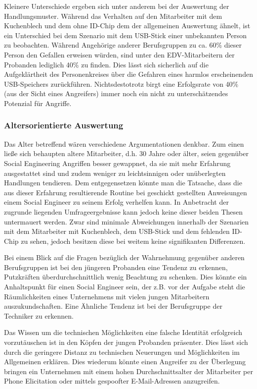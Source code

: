 Kleinere Unterschiede ergeben sich unter anderem bei der Auswertung der Handlungsmuster.
Während das Verhalten auf den Mitarbeiter mit dem Kuchenblech und dem ohne ID-Chip dem der allgemeinen Auswertung ähnelt, ist ein Unterschied bei dem Szenario mit dem USB-Stick einer unbekannten Person zu beobachten.
Während Angehörige anderer Berufsgruppen zu ca. 60\% dieser Person den Gefallen erweisen würden, sind unter den EDV-Mitarbeitern der Probanden lediglich 40\% zu finden.
Dies lässt sich sicherlich auf die Aufgeklärtheit des Personenkreises über die Gefahren eines harmlos erscheinenden USB-Speichers zurückführen.
Nichtsdestotrotz birgt eine Erfolgsrate von 40\% (aus der Sicht eines Angreifers) immer noch ein nicht zu unterschätzendes Potenzial für Angriffe.

\subsubsection{Altersorientierte Auswertung}\label{ref:altersorientierte-auswertung}

Das Alter betreffend wären verschiedene Argumentationen denkbar.
Zum einen ließe sich behaupten altere Mitarbeiter, d.h. 30 Jahre oder älter, seien gegenüber Social Engineering Angriffen besser gewappnet, da sie mit mehr Erfahrung ausgestattet sind und zudem weniger zu leichtsinnigen oder unüberlegten Handlungen tendieren.
Dem entgegensetzen könnte man die Tatsache, dass die aus dieser Erfahrung resultierende Routine bei geschickt gestellten Anweisungen einem Social Engineer zu seinem Erfolg verhelfen kann.
In Anbetracht der zugrunde liegenden Umfrageergebnisse kann jedoch keine dieser beiden Thesen untermauert werden.
Zwar sind minimale Abweichungen innerhalb der Szenarien mit dem Mitarbeiter mit Kuchenblech, dem USB-Stick und dem fehlenden ID-Chip zu sehen, jedoch besitzen diese bei weitem keine signifikanten Differenzen.

Bei einem Blick auf die Fragen bezüglich der Wahrnehmung gegenüber anderen Berufsgruppen ist bei den jüngeren Probanden eine Tendenz zu erkennen, Putzkräften überdurchschnittlich wenig Beachtung zu schenken.
Dies könnte ein Anhaltspunkt für einen Social Engineer sein, der z.B. vor der Aufgabe steht die Räumlichkeiten eines Unternehmens mit vielen jungen Mitarbeitern auszukundschaften.
Eine Ähnliche Tendenz ist bei der Berufsgruppe der Techniker zu erkennen.

Das Wissen um die technischen Möglichkeiten eine falsche Identität erfolgreich vorzutäuschen ist in den Köpfen der jungen Probanden präsenter.
Dies lässt sich durch die geringere Distanz zu technischen Neuerungen und Möglichkeiten im Allgemeinen erklären.
Dies wiederum könnte einen Angreifer zu der Überlegung bringen ein Unternehmen mit einem hohen Durchschnittsalter der Mitarbeiter per Phone Elicitation oder mittels gespoofter E-Mail-Adressen anzugreifen.

